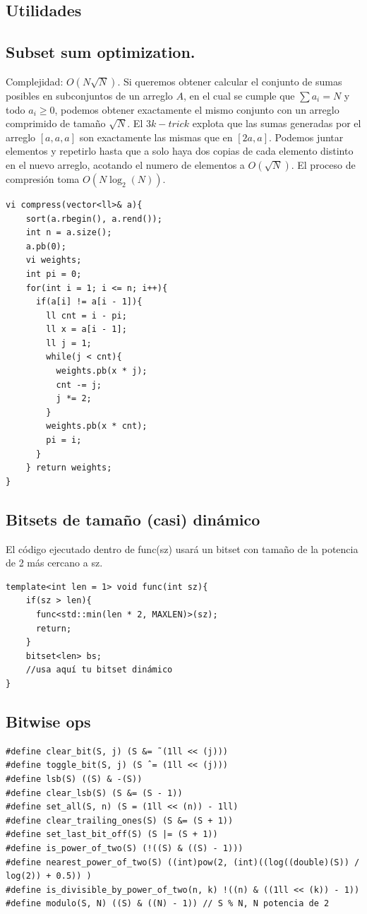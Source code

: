 \documentclass[10pt,spanish,mexico]{article}
\numberwithin{equation}{section}
\begin{document}
\begin{multicols}{2}
\vspace{-1.2\baselineskip}
\hrulefill
\section{Utilidades}
\subsection{Subset sum optimization.}
Complejidad: $O(N\sqrt{N})$. Si queremos obtener calcular el conjunto de sumas posibles en subconjuntos de un arreglo $A$, en el cual se cumple que $\sum a_i = N$ y todo $a_i\geq0$, podemos obtener exactamente el mismo conjunto con un arreglo comprimido de tamaño $\sqrt{N}$. El $3k-trick$ explota que las sumas generadas por el arreglo $[a,a,a]$ son exactamente las mismas que en $[2a,a]$. Podemos juntar elementos y repetirlo hasta que a solo haya dos copias de cada elemento distinto en el nuevo arreglo, acotando el numero de elementos a $O(\sqrt{N})$. El proceso de compresión toma $O(N\log_2(N))$.
\begin{verbatim}
vi compress(vector<ll>& a){
    sort(a.rbegin(), a.rend());
    int n = a.size();
    a.pb(0);
    vi weights;
    int pi = 0;
    for(int i = 1; i <= n; i++){
      if(a[i] != a[i - 1]){
        ll cnt = i - pi;
        ll x = a[i - 1];
        ll j = 1;
        while(j < cnt){
          weights.pb(x * j);
          cnt -= j;
          j *= 2;
        }
        weights.pb(x * cnt);
        pi = i;
      }
    } return weights;
}
\end{verbatim}

\vspace{-1.2\baselineskip}
\hrulefill
\subsection{Bitsets de tamaño (casi) dinámico}
El código ejecutado dentro de func(sz) usará un bitset con tamaño de la potencia de 2 más cercano a sz.
\begin{verbatim}
template<int len = 1> void func(int sz){
    if(sz > len){
      func<std::min(len * 2, MAXLEN)>(sz);
      return;
    }
    bitset<len> bs;
    //usa aquí tu bitset dinámico
}
\end{verbatim}

\vspace{-1.2\baselineskip}
\hrulefill
\subsection{Bitwise ops}
\begin{verbatim}
#define clear_bit(S, j) (S &= ˜(1ll << (j)))
#define toggle_bit(S, j) (S ˆ= (1ll << (j)))
#define lsb(S) ((S) & -(S))
#define clear_lsb(S) (S &= (S - 1))
#define set_all(S, n) (S = (1ll << (n)) - 1ll)
#define clear_trailing_ones(S) (S &= (S + 1))
#define set_last_bit_off(S) (S |= (S + 1))
#define is_power_of_two(S) (!((S) & ((S) - 1)))
#define nearest_power_of_two(S) ((int)pow(2, (int)((log((double)(S)) / log(2)) + 0.5)) )
#define is_divisible_by_power_of_two(n, k) !((n) & ((1ll << (k)) - 1))
#define modulo(S, N) ((S) & ((N) - 1)) // S % N, N potencia de 2
\end{verbatim}


\end{multicols}
\end{document}
